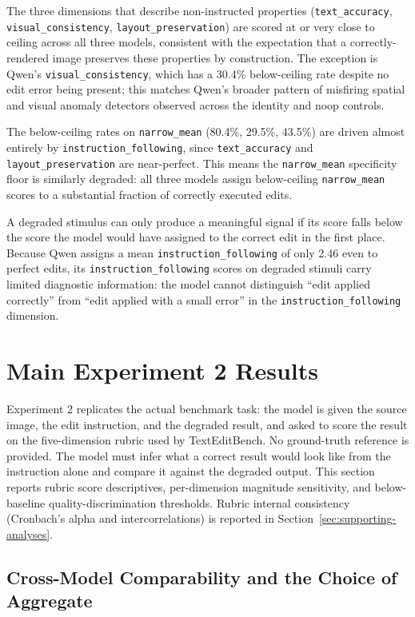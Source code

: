 The three dimensions that describe non-instructed properties (\texttt{text\_accuracy}, \texttt{visual\_consistency}, \texttt{layout\_preservation}) are scored at or very close to ceiling across all three models, consistent with the expectation that a correctly-rendered image preserves these properties by construction. The exception is Qwen's \texttt{visual\_consistency}, which has a 30.4\% below-ceiling rate despite no edit error being present; this matches Qwen's broader pattern of misfiring spatial and visual anomaly detectors observed across the identity and noop controls.

The below-ceiling rates on \texttt{narrow\_mean} (80.4\%, 29.5\%, 43.5\%) are driven almost entirely by \texttt{instruction\_following}, since \texttt{text\_accuracy} and \texttt{layout\_preservation} are near-perfect. This means the \texttt{narrow\_mean} specificity floor is similarly degraded: all three models assign below-ceiling \texttt{narrow\_mean} scores to a substantial fraction of correctly executed edits.

A degraded stimulus can only produce a meaningful signal if its score falls below the score the model would have assigned to the correct edit in the first place. Because Qwen assigns a mean \texttt{instruction\_following} of only 2.46 even to perfect edits, its \texttt{instruction\_following} scores on degraded stimuli carry limited diagnostic information: the model cannot distinguish ``edit applied correctly'' from ``edit applied with a small error'' in the \texttt{instruction\_following} dimension.


\section{Main Experiment 2 Results} \label{sec:main-results}

Experiment 2 replicates the actual benchmark task: the model is given the source image, the edit instruction, and the degraded result, and asked to score the result on the five-dimension rubric used by TextEditBench. No ground-truth reference is provided. The model must infer what a correct result would look like from the instruction alone and compare it against the degraded output. This section reports rubric score descriptives, per-dimension magnitude sensitivity, and below-baseline quality-discrimination thresholds. Rubric internal consistency (Cronbach's alpha and intercorrelations) is reported in Section~\ref{sec:supporting-analyses}.

\subsection{Cross-Model Comparability and the Choice of Aggregate} \label{sec:comparability}

